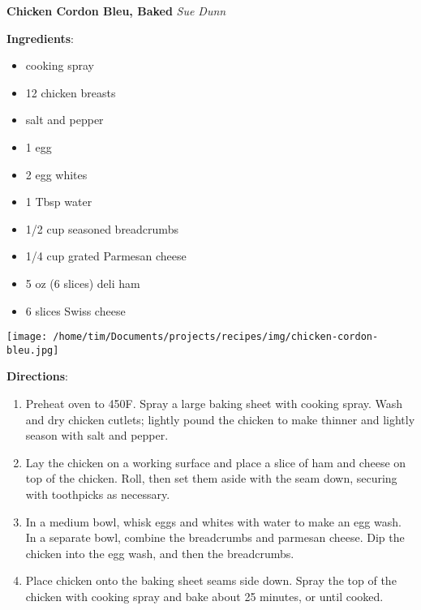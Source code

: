 \documentclass[11pt, twoside, openany]{book}
\begin{document}
\noindent\begin{minipage}[t]{\linewidth}%
{\Large\textbf{Chicken Cordon Bleu, Baked}} \label{chicken-cordon-bleu,-baked}\hfill\textit{Sue Dunn}\\
\noindent\begin{minipage}[t]{0.78\linewidth}%
\textbf{Ingredients}:\vspace{-3mm}
\begin{multicols}{2}
\begin{itemize}\setlength\itemsep{-1mm}
\item cooking spray
\item 12 chicken breasts
\item salt and pepper
\item 1 egg
\item 2 egg whites
\item 1 Tbsp water
\item 1/2 cup seasoned breadcrumbs
\item 1/4 cup grated Parmesan cheese
\item 5 oz (6 slices) deli ham
\item 6 slices Swiss cheese
\end{itemize}
\end{multicols}
\end{minipage}
\noindent\begin{minipage}[t]{0.18\linewidth}
\centering \strut\vspace*{-\baselineskip}\newline
\texttt{[image: /home/tim/Documents/projects/recipes/img/chicken-cordon-bleu.jpg]}\\
\end{minipage}\vspace{3mm}
\textbf{Directions}:
\vspace{-3mm}\begin{enumerate}\setlength\itemsep{-1mm}
\item Preheat oven to 450F. Spray a large baking sheet with cooking spray. Wash and dry chicken cutlets; lightly pound the chicken to make thinner and lightly season with salt and pepper.
\item Lay the chicken on a working surface and place a slice of ham and cheese on top of the chicken. Roll, then set them aside with the seam down, securing with toothpicks as necessary.
\item In a medium bowl, whisk eggs and whites with water to make an egg wash. In a separate bowl, combine the breadcrumbs and parmesan cheese. Dip the chicken into the egg wash, and then the breadcrumbs.
\item Place chicken onto the baking sheet seams side down. Spray the top of the chicken with cooking spray and bake about 25 minutes, or until cooked.
\end{enumerate}
\end{minipage}\vspace{8mm}
\end{document}
